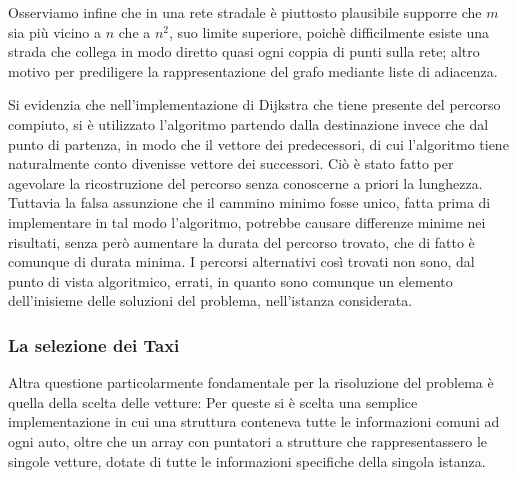 \documentclass[a4paper,11pt]{Article}
\begin{document}
Osserviamo infine che in una rete stradale è piuttosto plausibile supporre che $m$ sia più vicino a $n$ che a $n^2$, suo limite superiore, poichè difficilmente esiste una strada che collega in modo diretto quasi ogni coppia di punti sulla rete; altro motivo per prediligere la rappresentazione del grafo mediante liste di adiacenza.

Si evidenzia che nell'implementazione di Dijkstra che tiene presente del percorso compiuto, si è utilizzato l'algoritmo partendo dalla destinazione invece che dal punto di partenza, in modo che il vettore dei predecessori, di cui l'algoritmo tiene naturalmente conto divenisse vettore dei successori. Ciò è stato fatto per agevolare la ricostruzione del percorso senza conoscerne a priori la lunghezza.
Tuttavia la falsa assunzione che il cammino minimo fosse unico, fatta prima di implementare in tal modo l'algoritmo, potrebbe causare differenze minime nei risultati, senza però aumentare la durata del percorso trovato, che di fatto è comunque di durata minima. I percorsi alternativi così trovati non sono, dal punto di vista algoritmico, errati, in quanto sono comunque un elemento dell'inisieme delle soluzioni del problema, nell'istanza considerata.

\subsubsection{La selezione dei Taxi}

Altra questione particolarmente fondamentale per la risoluzione del problema è quella della scelta delle vetture: Per queste si è scelta una semplice implementazione in cui una struttura conteneva tutte le informazioni comuni ad ogni auto, oltre che un array con puntatori a strutture che rappresentassero le singole vetture, dotate di tutte le informazioni specifiche della singola istanza.
\end{document}
